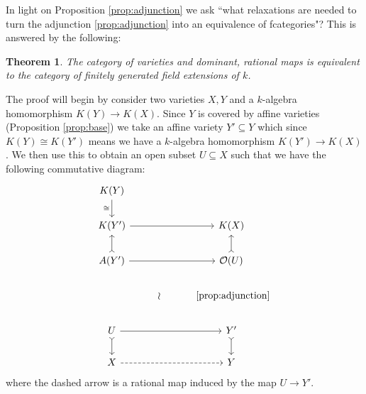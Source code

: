 \documentclass[12pt]{article}
\theoremstyle{plain}
\newtheorem{thm}{Theorem}[subsection] %
\theoremstyle{definition}
\newcommand{\call}[1]{\mathcal{#1}}
\newcommand{\lto}{\longrightarrow}
\begin{document}
In light on Proposition \ref{prop:adjunction} we ask ``what relaxations are needed to turn the adjunction \ref{prop:adjunction} into an equivalence of ƒcategories"? This is answered by the following:
\begin{thm}
\label{thm:equivalence_of_cats}
The category of varieties and dominant, rational maps is equivalent to the category of finitely generated field extensions of $k$.
\end{thm}
The proof will begin by consider two varieties $X,Y$ and a $k$-algebra homomorphism $K(Y) \lto K(X)$. Since $Y$ is covered by affine varieties (Proposition \ref{prop:base}) we take an affine variety $Y' \subseteq Y$ which since $K(Y) \cong K(Y')$ means we have a $k$-algebra homomorphism $K(Y') \lto K(X)$. We then use this to obtain an open subset $U \subseteq X$ such that we have the following commutative diagram:
\[
\begin{tikzcd}
K(Y)\arrow[d,swap,"{\cong}"]\\
K(Y')\arrow[rr] & & K(X)\\
A(Y')\arrow[u,rightarrowtail]\arrow[rr] & & \call{O}(U)\arrow[u,rightarrowtail]\\
& \wr &\text{ \eqref{prop:adjunction}}\\
U\arrow[rr]\arrow[d,rightarrowtail] & & Y'\arrow[d,rightarrowtail]\\
X\arrow[rr,dashed] & & Y
\end{tikzcd}
\]
where the dashed arrow is a rational map induced by the map $U \lto Y'$.
\end{document}
